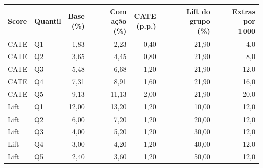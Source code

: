 \begin{tabular}{llrrrrr}
\toprule
Score & Quantil & \shortstack{Base\\(\%)} & \shortstack{Com ação\\(\%)} & \shortstack{CATE\\(p.p.)} & \shortstack{Lift do grupo\\(\%)} & \shortstack{Extras por\\1\,000} \\
\midrule
CATE & Q1 & 1,83 & 2,23 & 0,40 & 21,90 & 4,0 \\
CATE & Q2 & 3,65 & 4,45 & 0,80 & 21,90 & 8,0 \\
CATE & Q3 & 5,48 & 6,68 & 1,20 & 21,90 & 12,0 \\
CATE & Q4 & 7,31 & 8,91 & 1,60 & 21,90 & 16,0 \\
CATE & Q5 & 9,13 & 11,13 & 2,00 & 21,90 & 20,0 \\
Lift & Q1 & 12,00 & 13,20 & 1,20 & 10,00 & 12,0 \\
Lift & Q2 & 6,00 & 7,20 & 1,20 & 20,00 & 12,0 \\
Lift & Q3 & 4,00 & 5,20 & 1,20 & 30,00 & 12,0 \\
Lift & Q4 & 3,00 & 4,20 & 1,20 & 40,00 & 12,0 \\
Lift & Q5 & 2,40 & 3,60 & 1,20 & 50,00 & 12,0 \\
\bottomrule
\end{tabular}
